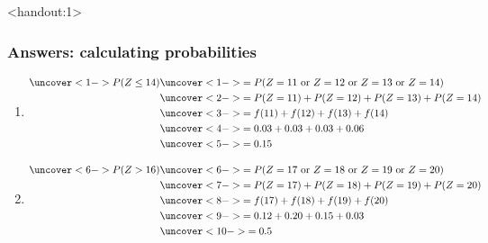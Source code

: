 \documentclass[handout]{beamer}\usepackage[]{graphicx}\usepackage[]{color}
\newcommand{\answers}{1}
\numberwithin{equation}{section}
\begin{document}
\begin{frame}<handout:\answers>
\frametitle{Answers: calculating probabilities} \scriptsize
\begin{enumerate}[1. ]
\item \begin{align*}
\uncover<1->{P(Z \le 14)} & \uncover<1->{= P(Z = 11 \text{ or } Z = 12 \text{ or } Z = 13 \text{ or } Z = 14)} \\
& \uncover<2->{= P(Z = 11) + P(Z = 12) + P(Z = 13) + P(Z = 14)} \\
& \uncover<3->{= f(11) + f(12) + f(13) + f(14)} \\
& \uncover<4->{= 0.03 + 0.03 + 0.03 + 0.06} \\
& \uncover<5->{= 0.15 }
\end{align*}
\item 
\begin{align*}
\uncover<6->{P(Z > 16)} & \uncover<6->{= P(Z = 17 \text{ or } Z = 18 \text{ or } Z = 19 \text{ or } Z = 20)} \\
&\uncover<7->{ = P(Z = 17) + P(Z = 18) + P(Z = 19) + P(Z =20)} \\
& \uncover<8->{= f(17) + f(18) + f(19) + f(20)} \\
& \uncover<9->{= 0.12 + 0.20 + 0.15 + 0.03} \\
& \uncover<10->{= 0.5}
\end{align*}
\end{enumerate}
\end{frame}
\end{document}
